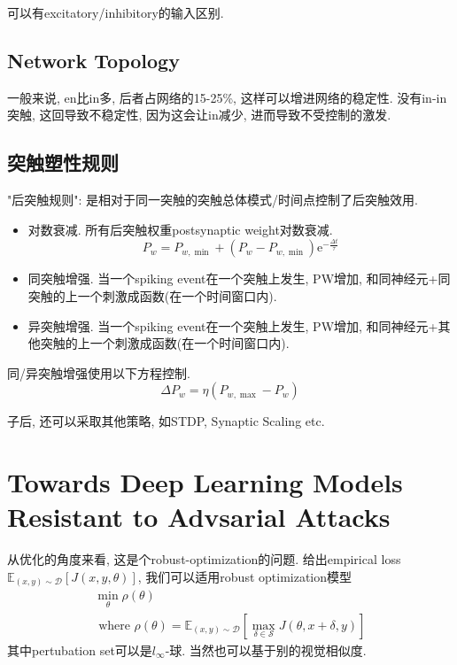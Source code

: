 \documentclass{article}
\begin{document}
可以有excitatory/inhibitory的输入区别.

\subsection{Network Topology}

一般来说, en比in多, 后者占网络的15-25\%, 这样可以增进网络的稳定性. 没有in-in突触, 这回导致不稳定性, 因为这会让in减少, 进而导致不受控制的激发.

\subsection{突触塑性规则}

"后突触规则": 是相对于同一突触的突触总体模式/时间点控制了后突触效用.

\begin{itemize}
    \item 对数衰减. 所有后突触权重postsynaptic weight对数衰减. 
    $$P_{w}=P_{w, \min }+\left(P_{w}-P_{w, \min }\right) \mathrm{e}^{-\frac{\Delta t}{\tau}}$$
    \item 同突触增强. 当一个spiking event在一个突触上发生, PW增加, 和同神经元+同突触的上一个刺激成函数(在一个时间窗口内).
    \item 异突触增强. 当一个spiking event在一个突触上发生, PW增加, 和同神经元+其他突触的上一个刺激成函数(在一个时间窗口内).
\end{itemize}

同/异突触增强使用以下方程控制. 
\begin{equation}
    \Delta P_{w}=\eta\left(P_{w, \max }-P_{w}\right)
\end{equation}

子后, 还可以采取其他策略, 如STDP, Synaptic Scaling etc.

\section{Towards Deep Learning Models Resistant to Advsarial Attacks}

从优化的角度来看, 这是个robust-optimization的问题. 给出empirical loss$\mathbb{E}_{(x, y) \sim \mathcal{D}}[J(x, y, \theta)]$, 我们可以适用robust optimization模型
\begin{equation}
    \begin{array}{c}
    \min _{\theta} \rho(\theta) \\
    \text { where } \rho(\theta)=\mathbb{E}_{(x, y) \sim \mathcal{D}}\left[\max _{\delta \in \mathcal{S}} J(\theta, x+\delta, y)\right]
    \end{array}
\end{equation}
其中pertubation set可以是$l_\infty$-球. 当然也可以基于别的视觉相似度.
\end{document}
